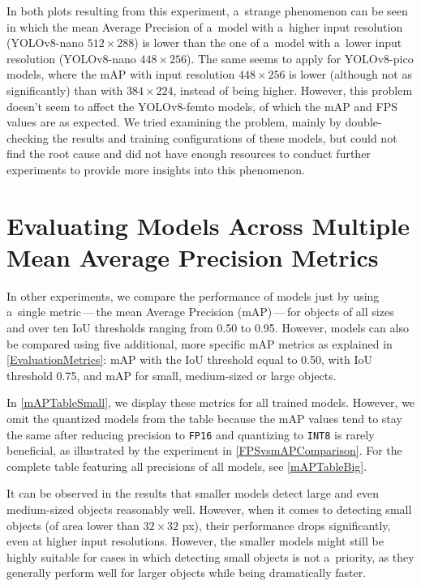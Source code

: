 In both plots resulting from this experiment, a~strange phenomenon can be seen
in which the mean Average Precision of a~model with a~higher input
resolution (YOLOv8-nano $512 \times 288$) is lower than the one of a~model
with a~lower input resolution (YOLOv8-nano $448 \times 256$). The same seems to apply for
YOLOv8-pico models, where the mAP with input resolution $448 \times 256$ is
lower (although not as significantly) than with $384 \times 224$, instead of
being higher. However, this problem doesn't seem to affect the YOLOv8-femto
models, of which the mAP and FPS values are as expected. We tried examining the
problem, mainly by double-checking the results and training configurations of
these models, but could not find the root cause and did not have enough
resources to conduct further experiments to provide more insights into this
phenomenon.


\section{Evaluating Models Across Multiple Mean Average Precision Metrics}

In other experiments, we compare the performance of models just by
using a~single metric\,---\,the mean Average Precision (mAP)\,---\,for objects of all
sizes and over ten IoU thresholds ranging from \num{0.50} to \num{0.95}.
However, models can also be compared using five additional, more specific mAP
metrics as explained in \autoref{EvaluationMetrics}: mAP with the IoU
threshold equal to \num{0.50}, with IoU threshold \num{0.75}, and mAP for small,
medium-sized or large objects.

In \autoref{mAPTableSmall}, we display these metrics for all trained models.
However, we omit the quantized models from the table because the mAP values tend
to stay the same after reducing precision to \texttt{FP16} and quantizing to
\texttt{INT8} is rarely beneficial, as illustrated by the experiment in
\autoref{FPSvsmAPComparison}. For the complete table featuring all precisions of
all models, see \autoref{mAPTableBig}.

It can be observed in the results that smaller models detect large and even
medium-sized objects reasonably well. However, when it comes to detecting small
objects (of area lower than $32 \times 32$ px), their performance drops
significantly, even at higher input resolutions. However, the smaller models
might still be highly suitable for cases in which detecting small objects is not
a~priority, as they generally perform well for larger objects while being
dramatically faster.

